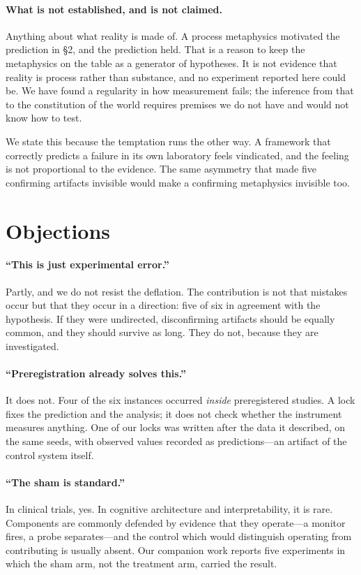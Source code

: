 \documentclass[11pt]{article}
\begin{document}
\paragraph{What is not established, and is not claimed.} Anything about what
reality is made of. A process metaphysics motivated the prediction in \S2, and
the prediction held. That is a reason to keep the metaphysics on the table as a
generator of hypotheses. It is not evidence that reality is process rather than
substance, and no experiment reported here could be. We have found a regularity
in how measurement fails; the inference from that to the constitution of the
world requires premises we do not have and would not know how to test.

We state this because the temptation runs the other way. A framework that
correctly predicts a failure in its own laboratory feels vindicated, and the
feeling is not proportional to the evidence. The same asymmetry that made five
confirming artifacts invisible would make a confirming metaphysics invisible
too.

\section{Objections}

\paragraph{``This is just experimental error.''} Partly, and we do not resist
the deflation. The contribution is not that mistakes occur but that they occur
in a direction: five of six in agreement with the hypothesis. If they were
undirected, disconfirming artifacts should be equally common, and they should
survive as long. They do not, because they are investigated.

\paragraph{``Preregistration already solves this.''} It does not. Four of the
six instances occurred \emph{inside} preregistered studies. A lock fixes the
prediction and the analysis; it does not check whether the instrument measures
anything. One of our locks was written after the data it described, on the same
seeds, with observed values recorded as predictions---an artifact of the
control system itself.

\paragraph{``The sham is standard.''} In clinical trials, yes. In cognitive
architecture and interpretability, it is rare. Components are commonly defended
by evidence that they operate---a monitor fires, a probe separates---and the
control which would distinguish operating from contributing is usually absent.
Our companion work reports five experiments in which the sham arm, not the
treatment arm, carried the result.
\end{document}
